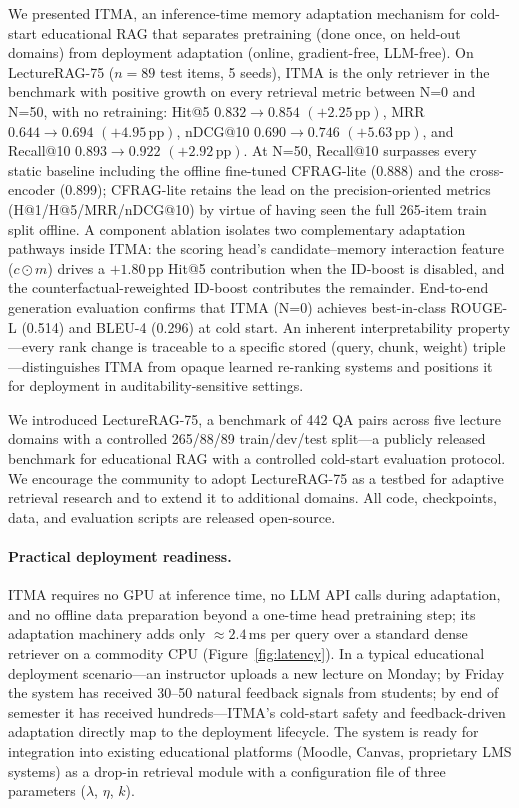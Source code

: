 \documentclass[preprint,12pt]{elsarticle}
\begin{document}
We presented ITMA, an inference-time memory adaptation mechanism for
cold-start educational RAG that separates pretraining (done once, on held-out
domains) from deployment adaptation (online, gradient-free, LLM-free).  On
LectureRAG-75 ($n{=}89$ test items, 5 seeds), ITMA is the only retriever in
the benchmark with positive growth on every retrieval metric between N=0 and
N=50, with no retraining: Hit@5 $0.832\rightarrow0.854$
$(+2.25\,\text{pp})$, MRR $0.644\rightarrow0.694$ $(+4.95\,\text{pp})$,
nDCG@10 $0.690\rightarrow0.746$ $(+5.63\,\text{pp})$, and Recall@10
$0.893\rightarrow0.922$ $(+2.92\,\text{pp})$.  At N=50, Recall@10 surpasses
every static baseline including the offline fine-tuned CFRAG-lite (0.888)
and the cross-encoder (0.899); CFRAG-lite retains the lead on the
precision-oriented metrics (H@1/H@5/MRR/nDCG@10) by virtue of having seen
the full 265-item train split offline.  A component ablation isolates two
complementary adaptation pathways inside ITMA: the scoring head's
candidate--memory interaction feature ($c{\odot}m$) drives a $+1.80\,\text{pp}$
Hit@5 contribution when the ID-boost is disabled, and the
counterfactual-reweighted ID-boost contributes the remainder.  End-to-end
generation evaluation confirms that ITMA (N=0) achieves best-in-class
ROUGE-L (0.514) and BLEU-4 (0.296) at cold start.  An inherent
interpretability property---every rank change is traceable to a specific
stored (query, chunk, weight) triple---distinguishes ITMA from opaque
learned re-ranking systems and positions it for deployment in
auditability-sensitive settings.

We introduced LectureRAG-75, a benchmark of 442 QA pairs across five lecture
domains with a controlled 265/88/89 train/dev/test split---a publicly
released benchmark for educational RAG with a controlled
cold-start evaluation protocol.  We encourage the community to adopt LectureRAG-75 as a testbed for
adaptive retrieval research and to extend it to additional domains.  All code,
checkpoints, data, and evaluation scripts are released open-source.

\paragraph{Practical deployment readiness.}
ITMA requires no GPU at inference time, no LLM API calls during adaptation,
and no offline data preparation beyond a one-time head pretraining step; its
adaptation machinery adds only $\approx2.4$\,ms per query over a standard dense
retriever on a commodity CPU (Figure~\ref{fig:latency}).  In
a typical educational deployment scenario---an instructor uploads a new lecture
on Monday; by Friday the system has received 30--50 natural feedback signals
from students; by end of semester it has received hundreds---ITMA's cold-start
safety and feedback-driven adaptation directly map to the deployment lifecycle.  The
system is ready for integration into existing educational platforms (Moodle,
Canvas, proprietary LMS systems) as a drop-in retrieval module with a
configuration file of three parameters ($\lambda$, $\eta$, $k$).
\end{document}
